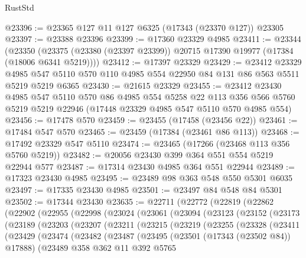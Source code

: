 \begin{lexlean}{RustStd}
\begin{coremodule}
@23396 := @23365 @127 @11 @127 @6325 (@17343 (@23370 @127)) @23305
@23397 := @23388 @23396
@23399 := @17360 @23329 @4985
@23411 := @23344
    (@23350 (@23375 (@23380 (@23397 @23399)) @20715 @17390 @19977 (@17384 (@18006 @6341 @5219))))
@23412 := @17397 @23329
@23429 := @23412
    @23329
    @4985
    @547
    @5110
    @570
    @110
    @4985
    @554
    @22950
    @84
    @131
    @86
    @563
    @5511
    @5219
    @5219
    @6365
@23430 := @21615 @23329
@23455 := @23412
    @23430
    @4985
    @547
    @5110
    @570
    @86
    @4985
    @554
    @5258
    @22
    @113
    @356
    @566
    @5760
    @5219
    @5219
    @22946
    (@17448 @23329 @4985 @547 @5110 @570 @4985 @554)
@23456 := @17478 @570
@23459 := @23455 (@17458 (@23456 @22))
@23461 := @17484 @547 @570
@23465 := @23459 (@17384 (@23461 @86 @113))
@23468 := @17492 @23329 @547 @5110
@23474 := @23465 (@17266 (@23468 @113 @356 @5760 @5219))
@23482 := @20056 @23430 @399 @364 @551 @554 @5219 @22944 @577
@23487 := @17314 @23430 @4985 @364 @551 @22944
@23489 := @17323 @23430 @4985
@23495 := @23489 @98 @363 @548 @550 @5301 @6035
@23497 := @17335 @23430 @4985
@23501 := @23497 @84 @548 @84 @5301
@23502 := @17344 @23430
@23635 := @22711
    (@22772
      (@22819
        (@22862
          (@22902
            (@22955
              (@22998
                (@23024
                  (@23061
                    (@23094
                      (@23123
                        (@23152
                          (@23173
                            (@23189
                              (@23203
                                (@23207
                                  (@23211
                                    (@23215
                                      (@23219
                                        (@23255
                                          (@23328
                                            (@23411
                                              (@23429
                                                (@23474
                                                  (@23482
                                                    (@23487
                                                      (@23495
                                                        (@23501 (@17343 (@23502 @84)) @17888)
                                                        (@23489
                                                          @358
                                                          @362
                                                          @11
                                                          @392
                                                          @5765

\end{coremodule}
\end{lexlean}

